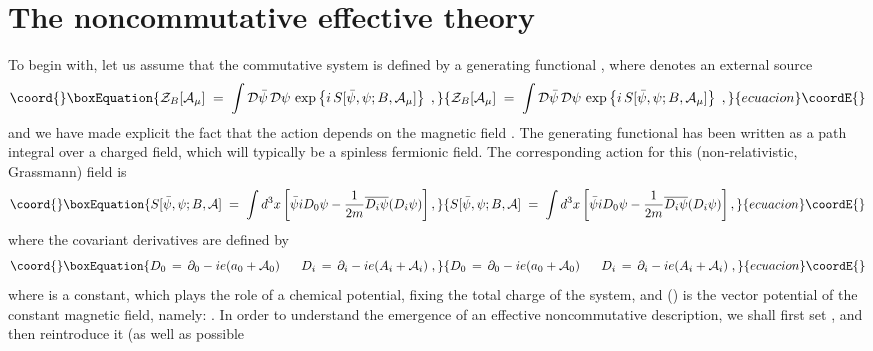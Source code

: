 \documentclass[a4paper,12pt]{article}
\begin{document}
\section{The noncommutative effective theory}\label{sec:eff}
To begin with, let us assume that the commutative system is defined by
a generating functional \coordHE{}, where
\coordHE{} denotes an external source
\begin{equation}\coord{}\boxEquation{
  \label{eq:zcomm}
  {\mathcal Z}_B[{\mathcal A}_\mu]\;=\; \int { \mathcal D}{\bar\psi}\,
{\mathcal D}\psi \, \exp \left\{i\, S[{\bar\psi},\psi;B,{\mathcal A}_\mu] \right\}     \;,
}{
  {\mathcal Z}_B[{\mathcal A}_\mu]\;=\; \int { \mathcal D}{\bar\psi}\,
{\mathcal D}\psi \, \exp \left\{i\, S[{\bar\psi},\psi;B,{\mathcal A}_\mu] \right\}     \;,
}{ecuacion}\coordE{}\end{equation}
and we have made explicit the fact that the action \coordHE{} depends on
the magnetic field \coordHE{}. The generating functional has been written 
as a path integral over a charged field, which will typically be a 
spinless fermionic field. The corresponding action for this 
(non-relativistic, Grassmann) field is 
\begin{equation}\coord{}\boxEquation{
S[{\bar \psi},\psi;B, {\mathcal A}] \;=\; \int d^3x \left[ {\bar\psi} 
i  D_0 \psi - \frac{1}{2m} \overline{D_i \psi} (D_i \psi) \right],
}{
S[{\bar \psi},\psi;B, {\mathcal A}] \;=\; \int d^3x \left[ {\bar\psi} 
i  D_0 \psi - \frac{1}{2m} \overline{D_i \psi} (D_i \psi) \right],
}{ecuacion}\coordE{}\end{equation}
where the covariant derivatives are defined by
\begin{equation}\coord{}\boxEquation{
  \label{eq:defcov}
D_0 \,=\, \partial_0 - ie(a_0 + {\mathcal A}_0)
\;\;\;\;\;\;
D_i \,=\, \partial_i - ie(A_i + {\mathcal A}_i)\;,
}{
  D_0 \,=\, \partial_0 - ie(a_0 + {\mathcal A}_0)
\;\;\;\;\;\;
D_i \,=\, \partial_i - ie(A_i + {\mathcal A}_i)\;,
}{ecuacion}\coordE{}\end{equation}
where \coordHE{} is a constant, which plays the role of a chemical
potential, fixing the total charge \coordHE{} of the system, and \coordHE{}
(\coordHE{}) is the vector potential of the constant magnetic field,
namely: \coordHE{}. In order to understand the emergence of
an effective noncommutative description, we shall first set \coordHE{}, and then reintroduce it (as well as possible
\end{document}
